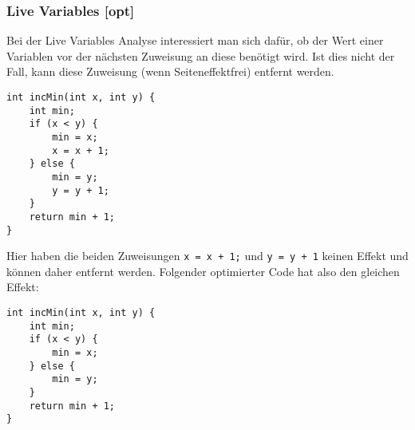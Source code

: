 \subsubsection{Live Variables [opt]}
Bei der Live Variables Analyse interessiert man sich dafür, ob der Wert einer Variablen vor der nächsten Zuweisung an diese benötigt wird. 
Ist dies nicht der Fall, kann diese Zuweisung (wenn Seiteneffektfrei) entfernt werden.

\begin{lstlisting}[frame=single]
int incMin(int x, int y) {
	int min;
	if (x < y) {
		min = x;
		x = x + 1;
	} else {
		min = y;
		y = y + 1;
	}
	return min + 1;
}
\end{lstlisting}
Hier haben die beiden Zuweisungen \lstinline{x = x + 1;} und \lstinline{y = y + 1} keinen Effekt und können daher entfernt werden.
Folgender optimierter Code hat also den gleichen Effekt:
\begin{lstlisting}[frame=single]
int incMin(int x, int y) {
	int min;
	if (x < y) {
		min = x;
	} else {
		min = y;
	}
	return min + 1;
}
\end{lstlisting}


